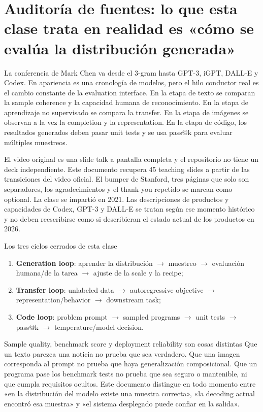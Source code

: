 \documentclass[a4paper]{article}
\begin{document}
\makecscover

\section{Auditoría de fuentes: lo que esta clase trata en realidad es «cómo se evalúa la distribución generada»}

La conferencia de Mark Chen va desde el 3-gram hasta GPT-3, iGPT, DALL-E y Codex. En apariencia es una cronología de modelos, pero el hilo conductor real es el cambio constante de la evaluation interface. En la etapa de texto se comparan la sample coherence y la capacidad humana de reconocimiento. En la etapa de aprendizaje no supervisado se compara la transfer. En la etapa de imágenes se observan a la vez la completion y la representation. En la etapa de código, los resultados generados deben pasar unit tests y se usa pass@k para evaluar múltiples muestreos.

El video original es una slide talk a pantalla completa y el repositorio no tiene un deck independiente. Este documento recupera 45 teaching slides a partir de las transiciones del video oficial. El bumper de Stanford, tres páginas que solo son separadores, los agradecimientos y el thank-you repetido se marcan como optional. La clase se impartió en 2021. Las descripciones de productos y capacidades de Codex, GPT-3 y DALL-E se tratan según ese momento histórico y no deben reescribirse como si describieran el estado actual de los productos en 2026.

\begin{importantbox}{Los tres ciclos cerrados de esta clase}
\begin{enumerate}
  \item \textbf{Generation loop}: aprender la distribución $\rightarrow$ muestreo $\rightarrow$ evaluación humana/de la tarea $\rightarrow$ ajuste de la scale y la recipe;
  \item \textbf{Transfer loop}: unlabeled data $\rightarrow$ autoregressive objective $\rightarrow$ representation/behavior $\rightarrow$ downstream task;
  \item \textbf{Code loop}: problem prompt $\rightarrow$ sampled programs $\rightarrow$ unit tests $\rightarrow$ pass@k $\rightarrow$ temperature/model decision.
\end{enumerate}
\end{importantbox}

\begin{warningbox}{Sample quality, benchmark score y deployment reliability son cosas distintas}
Que un texto parezca una noticia no prueba que sea verdadero. Que una imagen corresponda al prompt no prueba que haya generalización composicional. Que un programa pase los benchmark tests no prueba que sea seguro o mantenible, ni que cumpla requisitos ocultos. Este documento distingue en todo momento entre «en la distribución del modelo existe una muestra correcta», «la decoding actual encontró esa muestra» y «el sistema desplegado puede confiar en la salida».
\end{warningbox}
\end{document}
